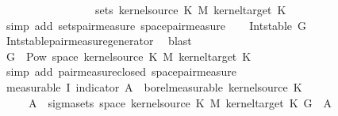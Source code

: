 \begin{isabellebody}
\ \ \ \ \ \ \ \ \ \ \ \ \ \ \ \ \ sets\ {\isacharparenleft}{\kern0pt}kernel{\isacharunderscore}{\kern0pt}source\ K\ {\isasymOtimes}\isactrlsub M\ kernel{\isacharunderscore}{\kern0pt}target\ K{\isacharparenright}{\kern0pt}{\isachardoublequoteclose}\isanewline
\ \ \ \ \isamarkupfalse%
\ {\isacharparenleft}{\kern0pt}simp\ add{\isacharcolon}{\kern0pt}\ sets{\isacharunderscore}{\kern0pt}pair{\isacharunderscore}{\kern0pt}measure\ space{\isacharunderscore}{\kern0pt}pair{\isacharunderscore}{\kern0pt}measure{\isacharparenright}{\kern0pt}\isanewline
\ \ \isamarkupfalse%
\ {\isachardoublequoteopen}Int{\isacharunderscore}{\kern0pt}stable\ {\isacharquery}{\kern0pt}G{\isachardoublequoteclose}\isanewline
\ \ \ \ \isamarkupfalse%
\ Int{\isacharunderscore}{\kern0pt}stable{\isacharunderscore}{\kern0pt}pair{\isacharunderscore}{\kern0pt}measure{\isacharunderscore}{\kern0pt}generator\ \isamarkupfalse%
\ blast\isanewline
\ \ \isamarkupfalse%
\ \isamarkupfalse%
\ {\isachardoublequoteopen}{\isacharquery}{\kern0pt}G\ {\isasymsubseteq}\ Pow\ {\isacharparenleft}{\kern0pt}space\ {\isacharparenleft}{\kern0pt}kernel{\isacharunderscore}{\kern0pt}source\ K\ {\isasymOtimes}\isactrlsub M\ kernel{\isacharunderscore}{\kern0pt}target\ K{\isacharparenright}{\kern0pt}{\isacharparenright}{\kern0pt}{\isachardoublequoteclose}\isanewline
\ \ \ \ \isamarkupfalse%
\ {\isacharparenleft}{\kern0pt}simp\ add{\isacharcolon}{\kern0pt}\ pair{\isacharunderscore}{\kern0pt}measure{\isacharunderscore}{\kern0pt}closed\ space{\isacharunderscore}{\kern0pt}pair{\isacharunderscore}{\kern0pt}measure{\isacharparenright}{\kern0pt}\isanewline
\ \ \isamarkupfalse%
\ \isamarkupfalse%
\ {\isacharbrackleft}{\kern0pt}measurable{\isacharbrackright}{\kern0pt}{\isacharcolon}{\kern0pt}\ {\isachardoublequoteopen}I\ {\isacharparenleft}{\kern0pt}indicator\ A{\isacharparenright}{\kern0pt}\ {\isasymin}\ borel{\isacharunderscore}{\kern0pt}measurable\ {\isacharparenleft}{\kern0pt}kernel{\isacharunderscore}{\kern0pt}source\ K{\isacharparenright}{\kern0pt}{\isachardoublequoteclose}\isanewline
\ \ \ \ \ {\isacartoucheopen}A\ {\isasymin}\ sigma{\isacharunderscore}{\kern0pt}sets\ {\isacharparenleft}{\kern0pt}space\ {\isacharparenleft}{\kern0pt}kernel{\isacharunderscore}{\kern0pt}source\ K\ {\isasymOtimes}\isactrlsub M\ kernel{\isacharunderscore}{\kern0pt}target\ K{\isacharparenright}{\kern0pt}{\isacharparenright}{\kern0pt}\ {\isacharquery}{\kern0pt}G{\isacartoucheclose}\ \ A\isanewline

\end{isabellebody}
